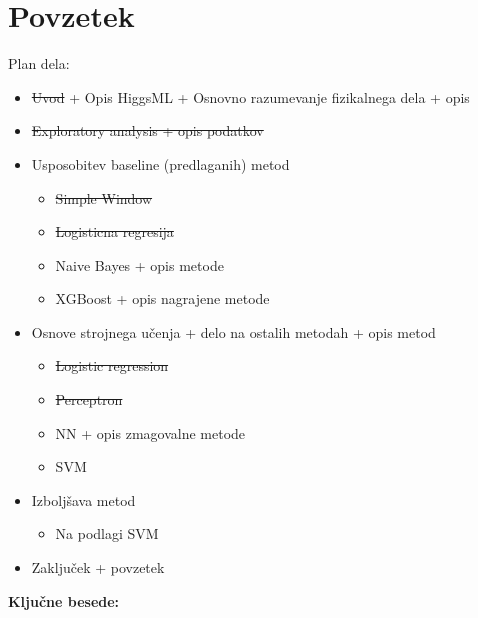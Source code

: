 \documentclass[11pt,a4paper,openany]{book}
\begin{document}










\chapter*{Povzetek}

Plan dela:
\begin{itemize}
	\item \st{Uvod} + Opis HiggsML + Osnovno razumevanje fizikalnega dela + opis
	\item \st{Exploratory analysis + opis podatkov}
	\item Usposobitev baseline (predlaganih) metod
		\begin{itemize}
			\item \st{Simple Window}
			\item \st{Logisticna regresija}
			\item Naive Bayes + opis metode
			\item XGBoost + opis nagrajene metode
		\end{itemize}
	\item Osnove strojnega učenja + delo na ostalih metodah + opis metod
		\begin{itemize}
			\item \st{Logistic regression}
			\item \st{Perceptron}
			\item NN + opis zmagovalne metode
			\item SVM
		\end{itemize}
	\item Izboljšava metod
		\begin{itemize}			
			\item Na podlagi SVM
		\end{itemize}
	\item Zaključek + povzetek
\end{itemize} 

\vspace{1.3cm}
\noindent
{\large \bf Ključne besede:}
\end{document}
